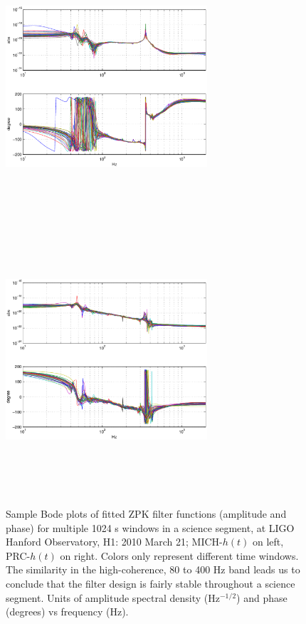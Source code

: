 \begin{figure}
\begin{center}
\includegraphics[height=100mm, width=75mm]{figure4a.eps}
\includegraphics[height=100mm, width=75mm]{figure4b.eps}
\caption{Sample Bode plots of fitted ZPK filter functions (amplitude and phase) for multiple 1024 s windows in a science segment, at LIGO Hanford Observatory, H1: 2010 March 21; MICH-$h(t)$ on left, PRC-$h(t)$ on right. Colors only represent different time windows. The similarity in the high-coherence, 80 to 400 Hz band leads us to conclude that the filter design is fairly stable throughout a science segment. Units of amplitude spectral density (Hz$^{-1/2}$) and phase (degrees) vs frequency (Hz).}
\label{BodePlots}
\end{center}
\end{figure}
